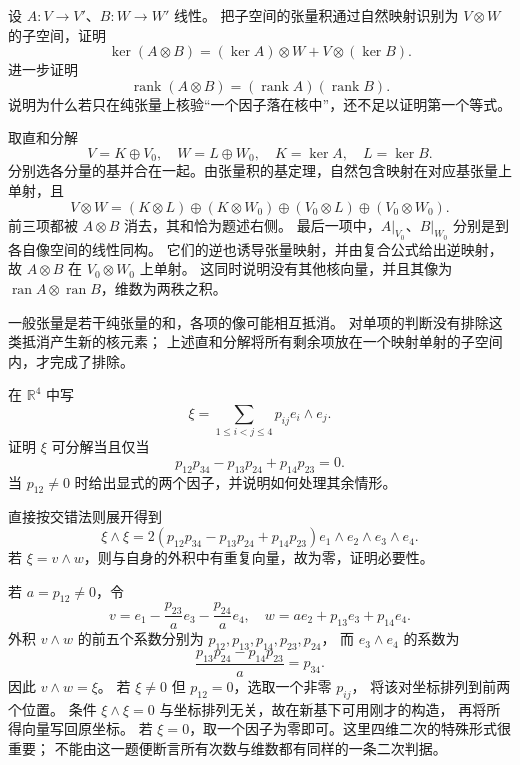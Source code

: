 \begin{exercise}\label{b1:ex:app-b-tensor-kernel}
设 \(A:V\rightarrow V'\)、\(B:W\rightarrow W'\) 线性。
把子空间的张量积通过自然映射识别为 \(V\otimes W\) 的子空间，证明
\[
 \ker(A\otimes B)
  =(\ker A)\otimes W+V\otimes(\ker B).
\]
进一步证明
\[
 \operatorname{rank}(A\otimes B)
   =(\operatorname{rank}A)(\operatorname{rank}B).
\]
说明为什么若只在纯张量上核验“一个因子落在核中”，还不足以证明第一个等式。
\end{exercise}
\begin{solution}
取直和分解
\[
 V=K\oplus V_0,\quad W=L\oplus W_0,\quad
 K=\ker A,\quad L=\ker B.
\]
分别选各分量的基并合在一起。由张量积的基定理，自然包含映射在对应基张量上单射，且
\[
 V\otimes W=(K\otimes L)\oplus(K\otimes W_0)
       \oplus(V_0\otimes L)\oplus(V_0\otimes W_0).
\]
前三项都被 \(A\otimes B\) 消去，其和恰为题述右侧。
最后一项中，\(A|_{V_0}\)、\(B|_{W_0}\) 分别是到各自像空间的线性同构。
它们的逆也诱导张量映射，并由复合公式给出逆映射，
故 \(A\otimes B\) 在 \(V_0\otimes W_0\) 上单射。
这同时说明没有其他核向量，并且其像为
\(\operatorname{ran}A\otimes\operatorname{ran}B\)，维数为两秩之积。

一般张量是若干纯张量的和，各项的像可能相互抵消。
对单项的判断没有排除这类抵消产生新的核元素；
上述直和分解将所有剩余项放在一个映射单射的子空间内，才完成了排除。
\end{solution}

\begin{exercise}\label{b1:ex:app-b-plucker-four}
在 \(\mathbb R^4\) 中写
\[
 \xi=\sum_{1\leq i<j\leq4}p_{ij}e_i\wedge e_j.
\]
证明 \(\xi\) 可分解当且仅当
\[
 p_{12}p_{34}-p_{13}p_{24}+p_{14}p_{23}=0.
\]
当 \(p_{12}\ne0\) 时给出显式的两个因子，并说明如何处理其余情形。
\end{exercise}
\begin{solution}
直接按交错法则展开得到
\[
 \xi\wedge\xi
 =2(p_{12}p_{34}-p_{13}p_{24}+p_{14}p_{23})
       e_1\wedge e_2\wedge e_3\wedge e_4.
\]
若 \(\xi=v\wedge w\)，则与自身的外积中有重复向量，故为零，证明必要性。

若 \(a=p_{12}\ne0\)，令
\[
 v=e_1-\frac{p_{23}}a e_3-\frac{p_{24}}a e_4,\quad
 w=ae_2+p_{13}e_3+p_{14}e_4.
\]
外积 \(v\wedge w\) 的前五个系数分别为
\(p_{12},p_{13},p_{14},p_{23},p_{24}\)，
而 \(e_3\wedge e_4\) 的系数为
\[
 \frac{p_{13}p_{24}-p_{14}p_{23}}a=p_{34}.
\]
因此 \(v\wedge w=\xi\)。
若 \(\xi\ne0\) 但 \(p_{12}=0\)，选取一个非零 \(p_{ij}\)，
将该对坐标排列到前两个位置。
条件 \(\xi\wedge\xi=0\) 与坐标排列无关，故在新基下可用刚才的构造，
再将所得向量写回原坐标。
若 \(\xi=0\)，取一个因子为零即可。这里四维二次的特殊形式很重要；
不能由这一题便断言所有次数与维数都有同样的一条二次判据。
\end{solution}

